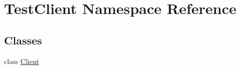\hypertarget{namespace_test_client}{}\section{Test\+Client Namespace Reference}
\label{namespace_test_client}
\subsection*{Classes}
\begin{DoxyCompactItemize}
\item 
class \mbox{\hyperlink{class_test_client_1_1_client}{Client}}
\end{DoxyCompactItemize}
